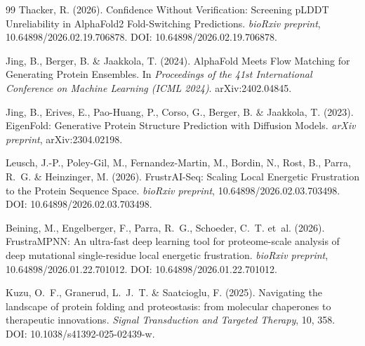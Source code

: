\documentclass[12pt,a4paper]{article}
\theoremstyle{remark}
\begin{document}
\begin{thebibliography}{99}
Thacker, R. (2026).
\newblock Confidence Without Verification: Screening pLDDT Unreliability in AlphaFold2 Fold-Switching Predictions.
\newblock \textit{bioRxiv preprint}, 10.64898/2026.02.19.706878.
\newblock DOI: 10.64898/2026.02.19.706878.

Jing, B., Berger, B. \& Jaakkola, T. (2024).
\newblock AlphaFold Meets Flow Matching for Generating Protein Ensembles.
\newblock In \textit{Proceedings of the 41st International Conference on Machine Learning (ICML 2024)}. arXiv:2402.04845.

Jing, B., Erives, E., Pao-Huang, P., Corso, G., Berger, B. \& Jaakkola, T. (2023).
\newblock EigenFold: Generative Protein Structure Prediction with Diffusion Models.
\newblock \textit{arXiv preprint}, arXiv:2304.02198.

Leusch, J.-P., Poley-Gil, M., Fernandez-Martin, M., Bordin, N., Rost, B., Parra, R.~G. \& Heinzinger, M. (2026).
\newblock FrustrAI-Seq: Scaling Local Energetic Frustration to the Protein Sequence Space.
\newblock \textit{bioRxiv preprint}, 10.64898/2026.02.03.703498.
\newblock DOI: 10.64898/2026.02.03.703498.

Beining, M., Engelberger, F., Parra, R.~G., Schoeder, C.~T. et~al. (2026).
\newblock FrustraMPNN: An ultra-fast deep learning tool for proteome-scale analysis of deep mutational single-residue local energetic frustration.
\newblock \textit{bioRxiv preprint}, 10.64898/2026.01.22.701012.
\newblock DOI: 10.64898/2026.01.22.701012.

Kuzu, O.~F., Granerud, L.~J.~T. \& Saatcioglu, F. (2025).
\newblock Navigating the landscape of protein folding and proteostasis: from molecular chaperones to therapeutic innovations.
\newblock \textit{Signal Transduction and Targeted Therapy}, 10, 358.
\newblock DOI: 10.1038/s41392-025-02439-w.

\end{thebibliography}
\end{document}
